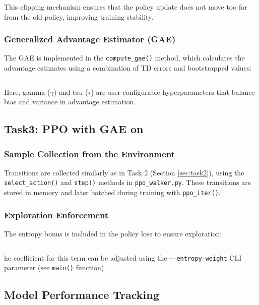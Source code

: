 This clipping mechanism ensures that the policy update does not move too far from the old policy, improving training stability.

\subsubsection{Generalized Advantage Estimator (GAE)}

The GAE is implemented in the \texttt{compute\_gae()} method, which calculates the advantage estimates using a combination of TD errors and bootstrapped values:
\inputminted[autogobble, firstline=96, lastline=104]{python}{../ppo_pendulum.py}

Here, gamma ($\gamma$) and tau ($\tau$) are user-configurable hyperparameters that balance bias and variance in advantage estimation.

\subsection{Task3: PPO with GAE on \walker}
\label{sec:task3}

\subsubsection{Sample Collection from the Environment}

Transitions are collected similarly as in Task 2 (Section \ref{sec:task2}), using the \texttt{select\_action()} and \texttt{step()} methods in \texttt{ppo\_walker.py}.
These transitions are stored in memory and later batched during training with \texttt{ppo\_iter()}.

\subsubsection{Exploration Enforcement}

The entropy bonus is included in the policy loss to ensure exploration:

\inputminted[autogobble, firstline=274, lastline=279, highlightlines=278]{python}{../ppo_walker.py}

he coefficient for this term can be adjusted using the \texttt{----entropy-weight} CLI parameter (see \texttt{main()} function).

\subsection{Model Performance Tracking}

